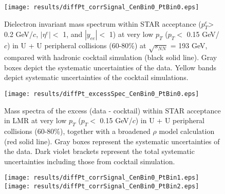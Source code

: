 \begin{figure}[htbp]
\begin{minipage}[htbp]{0.50\linewidth}
\centering
\texttt{[image: results/diffPt\_corrSignal\_CenBin0\_PtBin0.eps]}
\caption{Dielectron invariant mass spectrum within STAR acceptance ($p_{T}^{e}$> 0.2 GeV/$c$, $|\eta^{e}|<$ 1, and $|y_{ee}|<$ 1) at very low $p_{T}$ ($ p_{T}<$ 0.15 GeV/$c$) in U + U peripheral collisions (60-80\%) at $\sqrt{s_{NN}}$ = 193 GeV, compared with hadronic cocktail simulation (black solid line). Gray boxes depict the systematic uncertainties of the data. Yellow bands depict systematic uncertainties of the cocktail simulations. \label{lowptMassSpec_Cen60_80}}
\end{minipage}
\hfill
\begin{minipage}[htbp]{0.48\linewidth}
\centering
\texttt{[image: results/diffPt\_excessSpec\_CenBin0\_PtBin0.eps]} 
\caption{Mass spectra of the excess (data - cocktail) within STAR acceptance in LMR at very low $p_{T}$ ($p_{T}<$ 0.15 GeV/$c$) in U + U peripheral collisions (60-80\%), together with a broadened $\rho$ model calculation (red solid line). Gray boxes represent the systematic uncertainties of the data. Dark violet brackets represent the total systematic uncertainties including those from cocktail simulation.\label{lowptExcessSpec_Cen60_80}}
\end{minipage}
\end{figure}

\begin{figure}[htbp]
\centering
\texttt{[image: results/diffPt\_corrSignal\_CenBin0\_PtBin1.eps]}
\texttt{[image: results/diffPt\_corrSignal\_CenBin0\_PtBin2.eps]}
\label{highptMassSpec_Cen60_80}
\end{figure}

